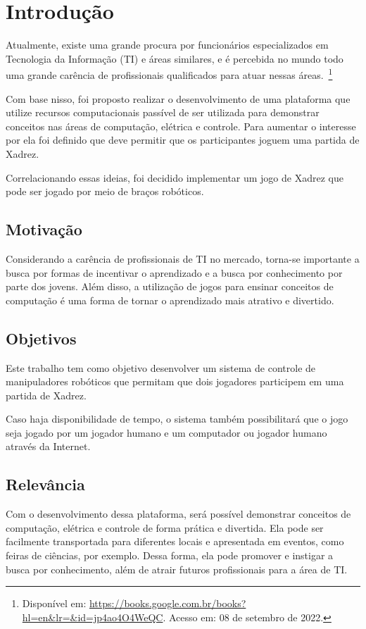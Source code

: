 \chapter[Introdução]{Introdução}
\label{cap:introducao}

Atualmente, existe uma grande procura por funcionários especializados em Tecnologia da Informação (TI) e áreas similares,
e é percebida no mundo todo uma grande carência de profissionais qualificados para atuar nessas áreas.~\footnote{Disponível em: \url{https://books.google.com.br/books?hl=en&lr=&id=jp4ao4O4WeQC}. Acesso em: 08 de setembro de 2022.}

Com base nisso, foi proposto realizar o desenvolvimento de uma plataforma que utilize recursos computacionais passível de ser utilizada para demonstrar conceitos nas áreas de computação, elétrica e controle.
Para aumentar o interesse por ela foi definido que deve permitir que os participantes joguem uma partida de Xadrez.

Correlacionando essas ideias, foi decidido implementar um jogo de Xadrez que pode ser jogado por meio de braços robóticos.

\section[Motivação]{Motivação}

Considerando a carência de profissionais de TI no mercado, torna-se importante a busca por formas de incentivar o aprendizado e a busca por conhecimento por parte dos jovens.
Além disso, a utilização de jogos para ensinar conceitos de computação é uma forma de tornar o aprendizado mais atrativo e divertido.

\section[Objetivos]{Objetivos}

Este trabalho tem como objetivo desenvolver um sistema de controle de manipuladores robóticos que permitam que dois jogadores participem em uma partida de Xadrez.

Caso haja disponibilidade de tempo, o sistema também possibilitará que o jogo seja jogado por um jogador humano e um computador ou jogador humano através da Internet.

\section[Relevância]{Relevância}

Com o desenvolvimento dessa plataforma, será possível demonstrar conceitos de computação, elétrica e controle de forma prática e divertida.
Ela pode ser facilmente transportada para diferentes locais e apresentada em eventos, como feiras de ciências, por exemplo.
Dessa forma, ela pode promover e instigar a busca por conhecimento, além de atrair futuros profissionais para a área de TI.